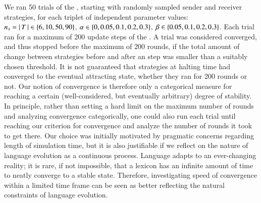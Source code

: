 \documentclass[fleqn,reqno,10pt]{article}
\newcommand{\rdd}{\acro{rdd}} %
\newcommand{\imprecision}{\ensuremath{\alpha}} %
\newcommand{\toler}{\ensuremath{\beta}} %
\newcommand{\ns}{\ensuremath{n_s}} %
\begin{document}
We ran 50 trials of the \rdd, starting with randomly sampled sender
and receiver strategies, for each triplet of independent parameter
values: $\ns = \card{T} \in \set{6, 10, 50, 90}$, $\imprecision \in
\set{0, 0.05, 0.1, 0.2, 0.3}$, $\toler \in \set{0.05, 0.1, 0.2,
  0.3}$. Each trial ran for a maximum of 200 update steps of the
\rdd. A trial was considered converged, and thus stopped before the maximum
of 200 rounds, if the total amount of change between strategies before
and after an \rdd step was smaller than a suitably chosen
threshold. It is not guaranteed that strategies at halting time had
converged to the eventual attracting state, whether they ran for 200
rounds or not. Our notion of convergence is therefore only a
categorical measure for reaching a certain (well-considered, but
eventually arbitrary) degree of stability. In principle, rather than
setting a hard limit on the maximum number of rounds and analyzing
convergence categorically, one could also run each trial until reaching
our criterion for convergence and analyze the number of rounds it took to get there.
Our choice was initially motivated by pragmatic concerns regarding length of
simulation time, but it is also justifiable if we reflect on the
nature of language evolution as a continuous process.
Language adapts to an ever-changing reality; it is rare, if not impossible,
that a lexicon has an infinite amount of time to neatly converge to a stable
state. Therefore, investigating speed of convergence within a limited
time frame can be seen as better reflecting the natural constraints of
language evolution.
\end{document}
